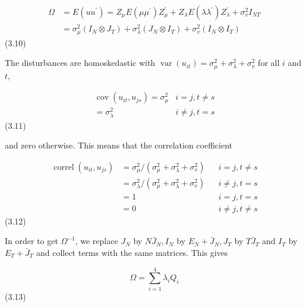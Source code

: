 \documentclass[
]{book}
\begin{document}
\begin{equation}
\begin{aligned}
\Omega &=E\left(u u^{\prime}\right)=Z_{\mu} E\left(\mu \mu^{\prime}\right) Z_{\mu}^{\prime}+Z_{\lambda} E\left(\lambda \lambda^{\prime}\right) Z_{\lambda}^{\prime}+\sigma_{v}^{2} I_{N T} \\
&=\sigma_{\mu}^{2}\left(I_{N} \otimes J_{T}\right)+\sigma_{\lambda}^{2}\left(J_{N} \otimes I_{T}\right)+\sigma_{v}^{2}\left(I_{N} \otimes I_{T}\right)
\end{aligned}
\end{equation} (3.10)

The disturbances are homoskedastic with \(\operatorname{var}\left(u_{i t}\right)=\sigma_{\mu}^{2}+\sigma_{\lambda}^{2}+\sigma_{v}^{2}\) for all \(i\) and \(t\),

\begin{equation}
\begin{array}{rl}
\operatorname{cov}\left(u_{i t}, u_{j s}\right)=\sigma_{\mu}^{2} & i=j, t \neq s \\
=\sigma_{\lambda}^{2} & i \neq j, t=s
\end{array}
\end{equation} (3.11)

and zero otherwise. This means that the correlation coefficient

\begin{equation}
\begin{aligned}
\operatorname{correl}\left(u_{i t}, u_{j s}\right) &=\sigma_{\mu}^{2} /\left(\sigma_{\mu}^{2}+\sigma_{\lambda}^{2}+\sigma_{v}^{2}\right) & & i=j, t \neq s \\
&=\sigma_{\lambda}^{2} /\left(\sigma_{\mu}^{2}+\sigma_{\lambda}^{2}+\sigma_{v}^{2}\right) & & i \neq j, t=s \\
&=1 & & i=j, t=s \\
&=0 & & i \neq j, t \neq s
\end{aligned}
\end{equation} (3.12)

In order to get \(\Omega^{-1}\), we replace \(J_{N}\) by \(N \bar{J}_{N}, I_{N}\) by \(E_{N}+\bar{J}_{N}, J_{T}\) by \(T \bar{J}_{T}\) and \(I_{T}\) by \(E_{T}+\bar{J}_{T}\) and collect terms with the same matrices. This gives

\begin{equation}
\Omega=\sum_{i=1}^{4} \lambda_{i} Q_{i}
\end{equation} (3.13)
\end{document}
